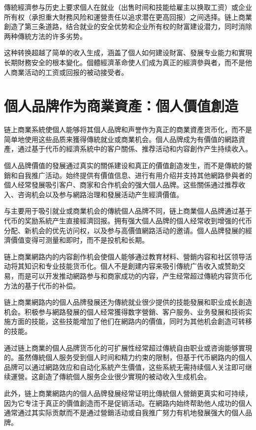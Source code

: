 \documentclass[
  Letterpaper,
]{scrbook}
\begin{document}
傳統經濟参与历史上要求個人在就业（出售时间和技能给雇主以换取工资）或企业所有权（承担重大財務风险和運營责任以追求潜在更高回报）之间选择。链上商業創造了第三条道路，结合就业的安全优势和企业所有权的財富建设潜力，同时消除两种傳統方法的许多劣势。

这种转换超越了简单的收入生成，涵盖了個人如何建设財富、發展专业能力和實現长期財務安全的根本變化。個體經濟革命使人们成为真正的經濟參與者，而不是他人商業活动的工资或回报的被动接受者。

\section{個人品牌作为商業資產：個人價值創造}\label{ux500bux4ebaux54c1ux724cux4f5cux4e3aux5546ux696dux8cc7ux7522ux500bux4ebaux50f9ux503cux5275ux9020}

链上商業系統使個人能够将其個人品牌和声誉作为真正的商業資產货币化，而不是简单地使用这些品质来獲得傳統就业或商業机会。個人品牌成为有價值的網路資產，通过基于代币的經濟系統中的客户關係、推荐活动和内容創作产生持续收入。

個人品牌價值的發展通过真实的關係建设和真正的價值創造发生，而不是傳統的營銷和自我推广活动。始终提供有價值信息、进行有用介绍并支持其他網路參與者的個人经常發展吸引客户、商家和合作机会的强大個人品牌。这些關係通过推荐收入、咨询机会以及参与網路治理和發展活动产生經濟價值。

与主要用于吸引就业或商業机会的傳統個人品牌不同，链上商業個人品牌通过基于代币的奖励系統产生直接經濟回报。拥有强大個人品牌的個人经常收到增强的代币分配、新机会的优先访问权，以及参与高價值網路活动的邀请。個人品牌發展的經濟價值变得可测量和即时，而不是投机和长期。

链上商業網路内的内容創作机会使個人能够通过教育材料、營銷内容和社区领导活动将其知识和专业技能货币化。個人不是創建内容来吸引傳統广告收入或赞助交易，而是可以开发推动網路参与和商家成功的内容，产生经常超过傳統内容货币化方法的基于代币的补偿。

链上商業網路内的個人品牌發展还为傳統就业很少提供的技能發展和职业成长創造机会。积极参与網路發展的個人经常獲得数字營銷、客户服务、业务發展和技術实施方面的技能，这些技能增加了他们在網路内的價值，同时为其他机会創造可转移的技能。

通过链上商業的個人品牌货币化的可扩展性经常超过傳統自由职业或咨询能够實現的。虽然傳統個人服务受到個人时间和精力约束的限制，但基于代币網路内的個人品牌可以通过網路效应和自动化系統产生價值，这些系統无需持续個人关注即可继续運營。这創造了傳統個人服务企业很少實現的被动收入生成机会。

此外，链上商業網路内的個人品牌發展经常证明比傳統個人營銷更真实和可持续，因为它专注于真正的價值創造而不是促销活动。在網路内始终帮助他人成功的個人通常通过其实际贡献而不是通过營銷活动或自我推广努力有机地發展强大的個人品牌。
\end{document}
